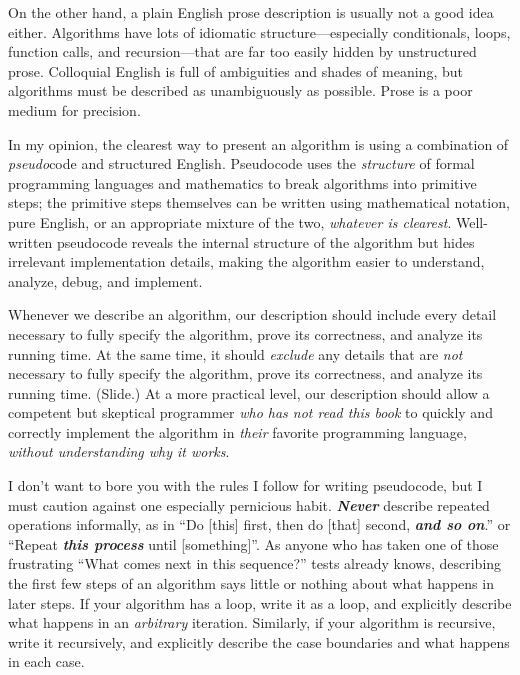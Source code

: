 On the other hand, a plain English prose description is usually not a good idea either. Algorithms have lots of idiomatic structure—especially conditionals, loops, function calls, and recursion—that are far too easily hidden by unstructured prose. Colloquial English is full of ambiguities and shades of meaning, but algorithms must be described as unambiguously as possible. Prose is a poor medium for precision.

In my opinion, the clearest way to present an algorithm is using a combination of \textit{pseudo}code and structured English. Pseudocode uses the \textit{structure} of formal programming languages and mathematics to break algorithms into primitive steps; the primitive steps themselves can be written using mathematical notation, pure English, or an appropriate mixture of the two, \textit{whatever is clearest}. Well-written pseudocode reveals the internal structure of the algorithm but hides irrelevant implementation details, making the algorithm easier to understand, analyze, debug, and implement.

Whenever we describe an algorithm, our description should include every detail necessary to fully specify the algorithm, prove its correctness, and analyze its running time. At the same time, it should \textit{exclude} any details that are \textit{not} necessary to fully specify the algorithm, prove its correctness, and analyze its running time. (Slide.) At a more practical level, our description should allow a competent but skeptical programmer \textit{who has not read this book} to quickly and correctly implement the algorithm in \textit{their} favorite programming language, \textit{without understanding why it works}.

I don’t want to bore you with the rules I follow for writing pseudocode, but I must caution against one especially pernicious habit. \textbf{\textit{Never}} describe repeated operations informally, as in “Do [this] first, then do [that] second, \textbf{\textit{and so on}}.” or “Repeat \textbf{\textit{this process}} until [something]”. As anyone who has taken one of those frustrating “What comes next in this sequence?” tests already knows, describing the first few steps of an algorithm says little or nothing about what happens in later steps. If your algorithm has a loop, write it as a loop, and explicitly describe what happens in an \textit{arbitrary} iteration. Similarly, if your algorithm is recursive, write it recursively, and explicitly describe the case boundaries and what happens in each case.

